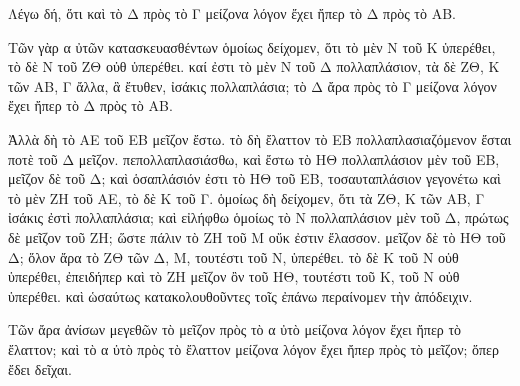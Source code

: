 \begin{Parallel}{}{}
{{\greekfont Λέγω δή, ὅτι καὶ τὸ Δ πρὸς τὸ Γ μείζονα λόγον ἔχει ἤπερ
τὸ Δ πρὸς τὸ ΑΒ.}

{\greekfont Τῶν γὰρ α ὐτῶν κατασκευασθέντων ὁμοίως δείχομεν, ὅτι
τὸ μὲν Ν τοῦ Κ ὑπερέθει, τὸ δὲ Ν τοῦ ΖΘ οὐθ ὑπερέθει.
καί ἐστι τὸ μὲν Ν τοῦ Δ πολλαπλάσιον, τὰ δὲ ΖΘ, Κ τῶν ΑΒ, Γ
ἄλλα, ἃ ἔτυθεν, ἰσάκις πολλαπλάσια; τὸ Δ ἄρα πρὸς τὸ Γ
μείζονα λόγον ἔχει ἤπερ τὸ Δ πρὸς τὸ ΑΒ.}

{\greekfont Ἀλλὰ δὴ τὸ ΑΕ τοῦ ΕΒ μεῖζον ἔστω. τὸ δὴ ἔλαττον τὸ ΕΒ
πολλαπλασιαζόμενον ἔσται ποτὲ τοῦ Δ μεῖζον. πεπολλαπλασιάσθω, καὶ
ἔστω τὸ ΗΘ πολλαπλάσιον μὲν τοῦ ΕΒ, μεῖζον δὲ τοῦ Δ; καὶ
ὁσαπλάσιόν ἐστι τὸ ΗΘ τοῦ ΕΒ, τοσαυταπλάσιον γεγονέτω
καὶ τὸ μὲν ΖΗ τοῦ ΑΕ, τὸ δὲ Κ τοῦ Γ. ὁμοίως δὴ δείχομεν,
ὅτι τὰ ΖΘ, Κ τῶν ΑΒ, Γ ἰσάκις ἐστὶ πολλαπλάσια; καὶ εἰλήφθω
ὁμοίως τὸ Ν πολλαπλάσιον μὲν τοῦ Δ, πρώτως δὲ μεῖζον
τοῦ ΖΗ; ὥστε πάλιν τὸ ΖΗ τοῦ Μ οὔκ ἐστιν ἔλασσον. μεῖζον
δὲ τὸ ΗΘ τοῦ Δ; ὅλον ἄρα τὸ ΖΘ τῶν Δ, Μ, τουτέστι τοῦ Ν,
ὑπερέθει. τὸ δὲ Κ τοῦ Ν οὐθ ὑπερέθει, ἐπειδήπερ καὶ τὸ
ΖΗ μεῖζον ὂν τοῦ ΗΘ, τουτέστι τοῦ Κ, τοῦ Ν οὐθ ὑπερέθει.
καὶ ὡσαύτως κατακολουθοῦντες τοῖς ἐπάνω περαίνομεν
τὴν ἀπόδειχιν.}

{\greekfont Τῶν ἄρα ἀνίσων μεγεθῶν τὸ μεῖζον πρὸς τὸ α ὐτὸ μείζονα λόγον ἔχει ἤπερ τὸ ἔλαττον; καὶ τὸ α ὐτὸ πρὸς τὸ ἔλαττον μείζονα
λόγον ἔχει ἤπερ πρὸς τὸ μεῖζον; ὅπερ ἔδει δεῖχαι.}}

\end{Parallel}
